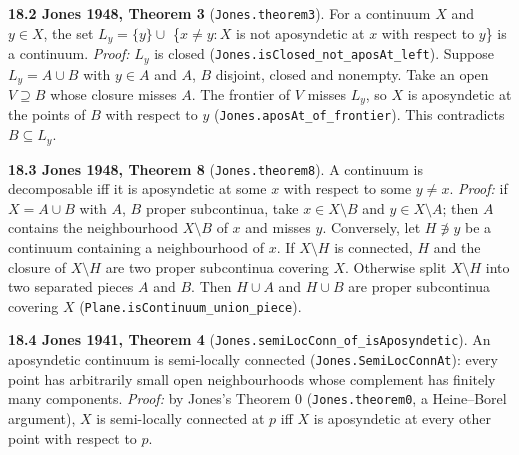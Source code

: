 \documentclass[11pt]{article}
\newcommand{\lean}[1]{\texttt{#1}}
\begin{document}
\textbf{18.2 Jones 1948, Theorem 3} (\lean{Jones.\hspace{0pt}theorem3}). For a continuum $X$ and $y \in X$, the set $L_y = \{y\} \cup$ \{$x \neq y : X$ is not aposyndetic at $x$ with respect to $y$\} is a continuum. \emph{Proof:} $L_y$ is closed (\lean{Jones.\hspace{0pt}isClosed\_\hspace{0pt}not\_\hspace{0pt}aposAt\_\hspace{0pt}left}). Suppose $L_y = A \cup B$ with $y \in A$ and $A$, $B$ disjoint, closed and nonempty. Take an open $V \supseteq B$ whose closure misses $A$. The frontier of $V$ misses $L_y$, so $X$ is aposyndetic at the points of $B$ with respect to $y$ (\lean{Jones.\hspace{0pt}aposAt\_\hspace{0pt}of\_\hspace{0pt}frontier}). This contradicts $B \subseteq L_y$.

\textbf{18.3 Jones 1948, Theorem 8} (\lean{Jones.\hspace{0pt}theorem8}). A continuum is decomposable iff it is aposyndetic at some $x$ with respect to some $y \neq x$. \emph{Proof:} if $X = A \cup B$ with $A$, $B$ proper subcontinua, take $x \in X \setminus B$ and $y \in X \setminus A$; then $A$ contains the neighbourhood $X \setminus B$ of $x$ and misses $y$. Conversely, let $H \not\ni y$ be a continuum containing a neighbourhood of $x$. If $X \setminus H$ is connected, $H$ and the closure of $X \setminus H$ are two proper subcontinua covering $X$. Otherwise split $X \setminus H$ into two separated pieces $A$ and $B$. Then $H \cup A$ and $H \cup B$ are proper subcontinua covering $X$ (\lean{Plane.\hspace{0pt}isContinuum\_\hspace{0pt}union\_\hspace{0pt}piece}).

\textbf{18.4 Jones 1941, Theorem 4} (\lean{Jones.\hspace{0pt}semiLocConn\_\hspace{0pt}of\_\hspace{0pt}isAposyndetic}). An aposyndetic continuum is semi-locally connected (\lean{Jones.\hspace{0pt}SemiLocConnAt}): every point has arbitrarily small open neighbourhoods whose complement has finitely many components. \emph{Proof:} by Jones's Theorem 0 (\lean{Jones.\hspace{0pt}theorem0}, a Heine--Borel argument), $X$ is semi-locally connected at $p$ iff $X$ is aposyndetic at every other point with respect to $p$.
\end{document}
